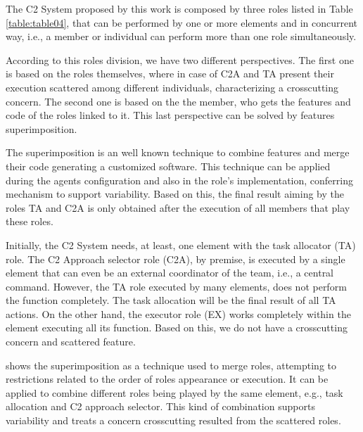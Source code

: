 The C2 System proposed by this work is composed by three roles listed in Table \ref{table:table04}, that can be performed by one or more elements and in concurrent way, i.e., a member or individual can perform more than one role simultaneously.



According to this roles division, we have two different perspectives. The first one is based on the roles themselves, where in case of C2A and TA present their execution scattered among different individuals, characterizing a crosscutting concern. The second one is based on the the member, who gets the features and code of the roles linked to it. This last perspective can be solved by features superimposition.

The superimposition is an well known technique to combine features and merge their code generating a customized software\cite{apel100}. This technique can be applied during the agents configuration and also in the role's implementation, conferring mechanism to support variability. Based on this, the final result aiming by the roles TA and C2A is only obtained after the execution of all members that play these roles.

Initially, the C2 System needs, at least, one element with the task allocator (TA) role. The C2 Approach selector role (C2A), by premise, is executed by a single element that can even be an external coordinator of the team, i.e., a central command. However, the TA role executed by many elements, does not perform the function completely. The task allocation will be the final result of all TA actions. On the other hand, the executor role (EX) works completely within the element executing all its function. Based on this, we do not have a crosscutting concern and scattered feature. 

\cite{apel100} shows the superimposition as a technique used to merge roles, attempting to restrictions related to the order of roles appearance or execution. It can be applied to combine different roles being played by the same element, e.g., task allocation and C2 approach selector. This kind of combination supports variability and treats a concern crosscutting resulted from the scattered roles\cite{apel2011, marin2005}.

